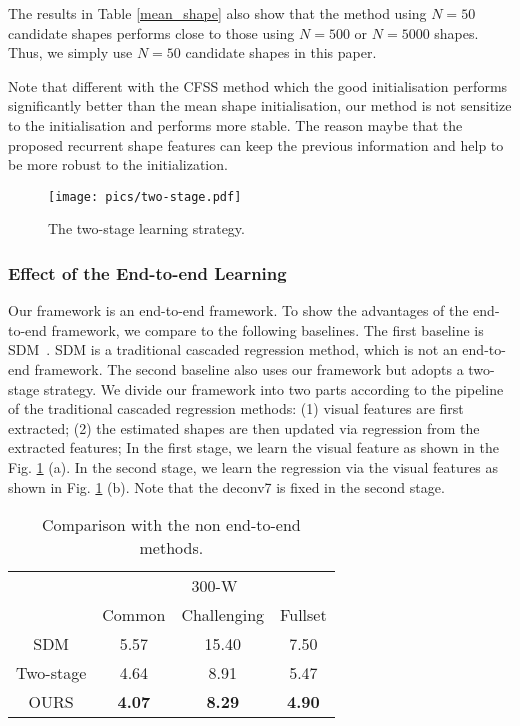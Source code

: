 \documentclass[journal]{IEEEtran}
\begin{document}
The results in Table \ref{mean_shape} also show that the method using $N=50$ candidate shapes performs close to those using $N=500$ or $N=5000$ shapes. Thus, we simply use $N=50$ candidate shapes in this paper.


Note that different with the CFSS method which the good initialisation performs significantly better than the mean shape initialisation, our method is not sensitize to the initialisation and performs more stable. The reason maybe that the proposed recurrent shape features can keep the previous information and help to be more robust to the initialization.


\begin{figure}[t]
\centering
    \texttt{[image: pics/two-stage.pdf]}
  \caption{The two-stage learning strategy. }
  \label{two-stages}  %
\end{figure}

\subsubsection{Effect of the End-to-end Learning}
Our framework is an end-to-end framework. To show the advantages of the end-to-end framework, we compare to the following baselines. The first baseline is SDM~\cite{sdm}. SDM is a traditional cascaded regression method, which is not an end-to-end framework. The second baseline also uses our framework but adopts a two-stage strategy. We divide our framework into two parts according to the pipeline of the traditional cascaded regression methods: (1) visual features are first extracted; (2) the estimated shapes are then updated via regression from the extracted features; In the first stage, we learn the visual feature as shown in the Fig. \ref{two-stages} (a). In the second stage, we learn the regression via the visual features as shown in Fig. \ref{two-stages} (b). Note that the deconv7 is fixed in the second stage.


\begin{table}[h]
\small
    \centering \caption{Comparison with the non end-to-end methods.}
    \begin{tabular}{c|c c c}
      \hline
 & \multicolumn{3}{|c}{300-W}\\
    & Common & Challenging & Fullset \\
        \hline
         SDM  & 5.57 & 15.40 & 7.50  \\
         \hline
        Two-stage & 4.64 & 8.91 & 5.47 \\
        \hline
        OURS & \textbf{4.07} & \textbf{8.29} & \textbf{4.90} \\
        \hline
        \end{tabular}
    \label{two-stage}
\end{table}
\end{document}
